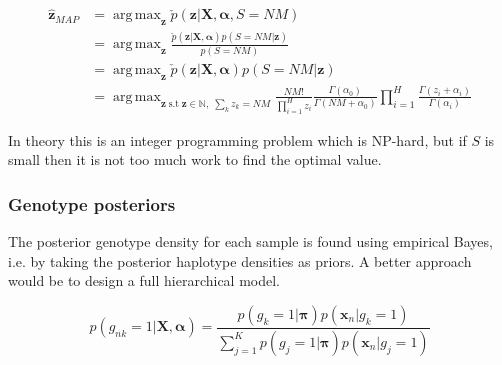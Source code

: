 \documentclass{article}
\DeclareMathOperator*{\argmax}{arg\,max}
\begin{document}
\begin{align}
    \hat{\boldsymbol{z}}_{MAP} &= \argmax_{\boldsymbol{z}} \check{p}(\boldsymbol{z} | \boldsymbol{X}, \boldsymbol{\alpha}, S = NM)\\
    &= \argmax_{\boldsymbol{z}} \frac{\check{p}(\boldsymbol{z} | \boldsymbol{X}, \boldsymbol{\alpha})p(S = NM | \boldsymbol{z})}{p(S = NM)}\\
    &= \argmax_{\boldsymbol{z}} \check{p}(\boldsymbol{z} | \boldsymbol{X}, \boldsymbol{\alpha})p(S = NM | \boldsymbol{z})\\
    &= \argmax_{\boldsymbol{z} \; \text{s.t} \; \boldsymbol{z} \in \mathbb{N},\; \sum_k z_k = NM} \frac{NM!}{\prod_{i = 1}^{H} z_i} \frac{\Gamma(\alpha_0)}{\Gamma(NM + \alpha_0)} \prod_{i = 1}^H \frac{\Gamma(z_i + \alpha_i)}{\Gamma(\alpha_i)}
\end{align}

In theory this is an integer programming problem which is NP-hard, but if $S$ is small then it is not too much work to find the optimal value.

\subsubsection{Genotype posteriors}

The posterior genotype density for each sample is found using empirical Bayes, i.e. by taking the posterior haplotype densities as priors. A better approach would be to design a full hierarchical model.

\begin{equation}
p(g_{nk} = 1 | \boldsymbol{X}, \boldsymbol{\alpha}) = \frac{p(g_k = 1 | \boldsymbol{\pi}) p(\boldsymbol{x}_n | g_k = 1)}{\sum_{j = 1}^K p(g_j = 1 | \boldsymbol{\pi}) p(\boldsymbol{x}_n | g_j = 1)}
\end{equation}
\end{document}
